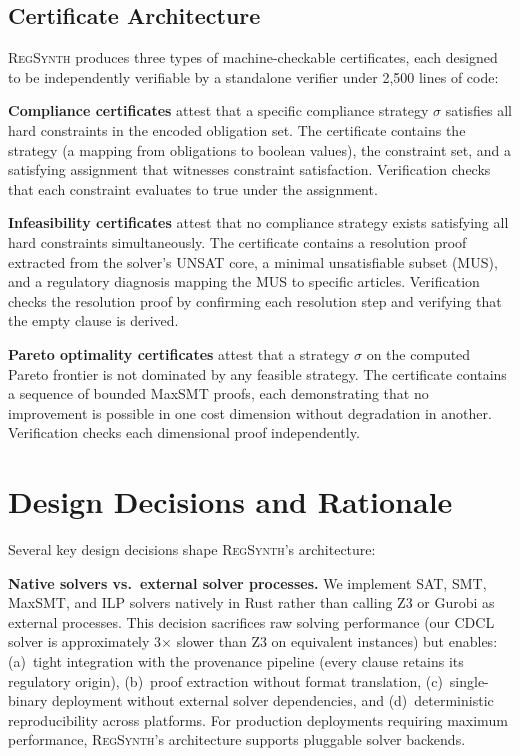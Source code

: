 \documentclass[11pt,twocolumn]{article}
\newcommand{\regsynth}{\textsc{RegSynth}}
\begin{document}
\subsection{Certificate Architecture}

\regsynth{} produces three types of machine-checkable certificates, each designed
to be independently verifiable by a standalone verifier under 2{,}500 lines of
code:

\textbf{Compliance certificates} attest that a specific compliance strategy
$\sigma$ satisfies all hard constraints in the encoded obligation set. The
certificate contains the strategy (a mapping from obligations to boolean values),
the constraint set, and a satisfying assignment that witnesses constraint
satisfaction. Verification checks that each constraint evaluates to true under
the assignment.

\textbf{Infeasibility certificates} attest that no compliance strategy exists
satisfying all hard constraints simultaneously. The certificate contains a
resolution proof extracted from the solver's UNSAT core, a minimal unsatisfiable
subset (MUS), and a regulatory diagnosis mapping the MUS to specific articles.
Verification checks the resolution proof by confirming each resolution step and
verifying that the empty clause is derived.

\textbf{Pareto optimality certificates} attest that a strategy $\sigma$ on the
computed Pareto frontier is not dominated by any feasible strategy. The
certificate contains a sequence of bounded MaxSMT proofs, each demonstrating
that no improvement is possible in one cost dimension without degradation in
another. Verification checks each dimensional proof independently.

\section{Design Decisions and Rationale}
\label{sec:design}

Several key design decisions shape \regsynth{}'s architecture:

\textbf{Native solvers vs.\ external solver processes.}
We implement SAT, SMT, MaxSMT, and ILP solvers natively in Rust rather than
calling Z3 or Gurobi as external processes. This decision sacrifices raw solving
performance (our CDCL solver is approximately 3$\times$ slower than Z3 on
equivalent instances) but enables: (a)~tight integration with the provenance
pipeline (every clause retains its regulatory origin), (b)~proof extraction
without format translation, (c)~single-binary deployment without external
solver dependencies, and (d)~deterministic reproducibility across platforms.
For production deployments requiring maximum performance, \regsynth{}'s
architecture supports pluggable solver backends.
\end{document}
